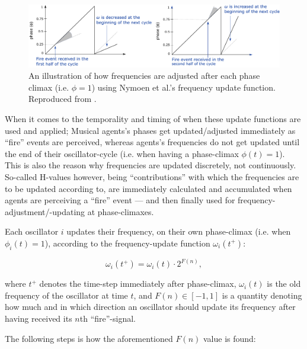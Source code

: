 	\begin{figure}[ht!]
		\centering
		\includegraphics[width=\linewidth]{Assets/DocSegments/Chapters/Baseline/Figures/Illustrations/NymoenFrequencyAdjustment.pdf}
		\caption[]{An illustration of how frequencies are adjusted after each phase climax (i.e. $\phi=1$) using Nymoen et al.'s frequency update function. Reproduced from \cite{nymoen_synch}.}
		\label{fig:nymoen_freq_adjust_illustration}
	\end{figure}
	
	When it comes to the temporality and timing of when these update functions are used and applied; Musical agents's phases get updated/adjusted immediately as ``fire'' events are perceived, whereas agents's frequencies do not get updated until the end of their oscillator-cycle (i.e. when having a phase-climax $\phi(t)=1$). This is also the reason why frequencies are updated discretely, not continuously. So-called H-values however, being ``contributions'' with which the frequencies are to be updated according to, are immediately calculated and accumulated when agents are perceiving a ``fire'' event — and then finally used for frequency-adjustment/-updating at phase-climaxes.
	
	Each oscillator $i$ updates their frequency, on their own phase-climax (i.e. when $\phi_i(t)=1$), according to the frequency-update function $\omega_i(t^+)$:

	\begin{equation}
		\omega_i(t^+) = \omega_i(t) \cdot 2^{F(n)},
	\end{equation}

	where $t^+$ denotes the time-step immediately after phase-climax, $\omega_i(t)$ is the old frequency of the oscillator at time $t$, and $F(n) \in [-1,1]$ is a quantity denoting how much and in which direction an oscillator should update its frequency after having received its $n$th ``fire''-signal.

	The following steps is how the aforementioned $F(n)$ value is found: 
	

